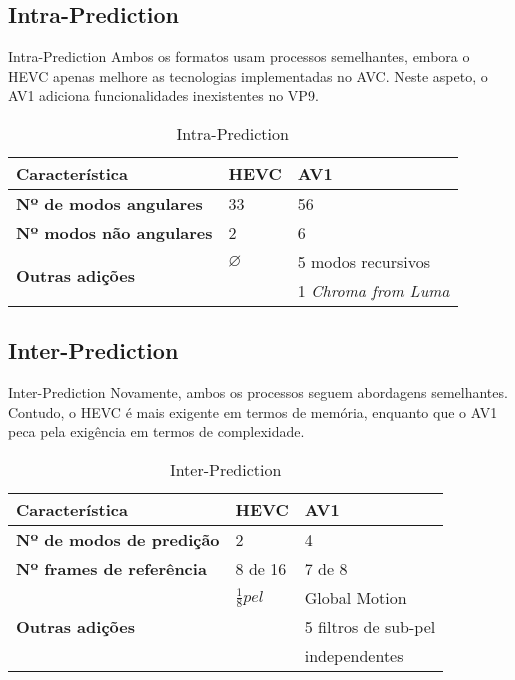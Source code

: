 \documentclass{beamer}
\begin{document}
\subsection{Intra-Prediction}
\begin{frame}{Intra-Prediction}
	Ambos os formatos usam processos semelhantes, embora o HEVC apenas melhore as tecnologias implementadas no AVC. Neste aspeto, o AV1 adiciona funcionalidades inexistentes no VP9.
	\begin{table}
		\centering
		\begin{tabular}{l|l|l}
			\textbf{Característica} 									& \textbf{HEVC} 	& \textbf{AV1} \\\hline
			\textbf{Nº de modos angulares} 						& 33 							& 56 \\
			\textbf{Nº modos não angulares} 						& 2	 							& 6 \\
			\multirow{2}{*}{\textbf{Outras adições}}	& $\varnothing$		& 5 modos recursivos \\
			 																					&									& 1 \textit{Chroma from Luma} \\
		\end{tabular}
		\caption{\label{tab:intra}Intra-Prediction}
	\end{table}
\end{frame}

\subsection{Inter-Prediction}
\begin{frame}{Inter-Prediction}
	Novamente, ambos os processos seguem abordagens semelhantes. Contudo, o HEVC é mais exigente em termos de memória, enquanto que o AV1 peca pela exigência em termos de complexidade.
	\begin{table}
		\centering
		\begin{tabular}{l|l|l}
			\textbf{Característica} 									& \textbf{HEVC} 	& \textbf{AV1} \\\hline
			\textbf{Nº de modos de predição} 					& 2 							& 4 \\
			\textbf{Nº frames de referência} 					& 8 de 16	 				& 7 de 8 \\
			\multirow{3}{*}{\textbf{Outras adições}}	& $\frac{1}{8} pel$		& Global Motion \\
			 																					&									& 5 filtros de sub-pel \\
																								&									& independentes \\
		\end{tabular}
		\caption{\label{tab:inter}Inter-Prediction}
	\end{table}
\end{frame}
\end{document}
